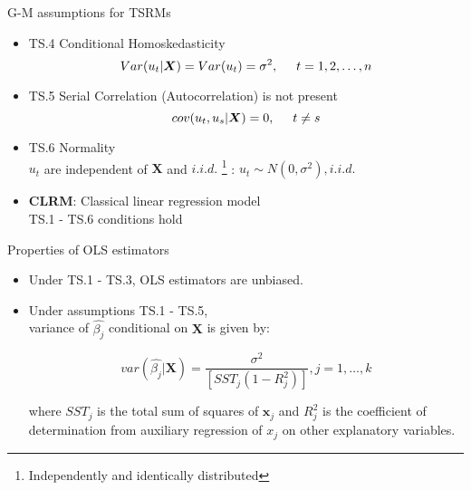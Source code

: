\documentclass{beamer}
\begin{document}

\begin{frame}{G-M assumptions for TSRMs}
\begin{itemize}
 \item TS.4 Conditional Homoskedasticity 
 $$Var(u_t|\boldsymbol{X})=Var(u_t)=\sigma^2, \hspace{0.5cm} t=1,2,\dots,n$$
 
 \item TS.5 Serial Correlation (Autocorrelation) is not present $$ cov(u_t,u_s|\boldsymbol{X}) = 0, \hspace{0.5cm} t\neq s$$

 \item TS.6 Normality \\
 $u_t$ are independent of $\boldsymbol{X}$ and $\textit{i.i.d.}$
 \footnote{Independently and identically distributed} 
 :  $u_t \sim N(0,\sigma^2), \textit{i.i.d.} $
 
 \vspace{0.6cm}
 
 \item \textbf{CLRM}: Classical linear regression model \\
 TS.1 - TS.6 conditions hold
 
\end{itemize}
\end{frame}


\begin{frame}{Properties of OLS estimators}
\begin{itemize}
\item Under TS.1 - TS.3, OLS estimators are unbiased.
\vspace{0.5cm}
\item Under assumptions TS.1 - TS.5, \\ 
variance of $\hat{\beta_j}$ conditional on $\boldsymbol{X}$ is given by: 

$$\textit{var}(\hat{\beta_j}|\boldsymbol{X}) 
  =\frac{\sigma^2}{[\textit{SST}_j(1-R^2_j)]},  j=1,\dots,k$$

where $\textit{SST}_j$ is the total sum of squares of $\boldsymbol{x}_{j}$ and $R^2_j$ is the coefficient of determination from auxiliary regression of $x_j$ on other explanatory variables. 
\end{itemize}
\end{frame}

\end{document}
